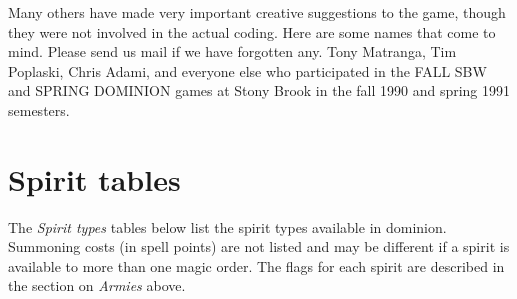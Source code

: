 Many others have made very important creative suggestions to the game,
though they were not involved in the actual coding.  Here are some
names that come to mind.  Please send us mail if we have forgotten
any.  Tony Matranga, Tim Poplaski, Chris Adami, and everyone else who
participated in the FALL SBW and SPRING DOMINION games at Stony Brook
in the fall 1990 and spring 1991 semesters.

\appendix

\chapter{Spirit tables}

\label{app-spirits}

The {\em Spirit types} tables below list the spirit types available
in dominion.  Summoning costs (in spell points) are not listed and may
be different if a spirit is available to more than one magic order.
The flags for each spirit are described in the section on
{\em Armies} above.

